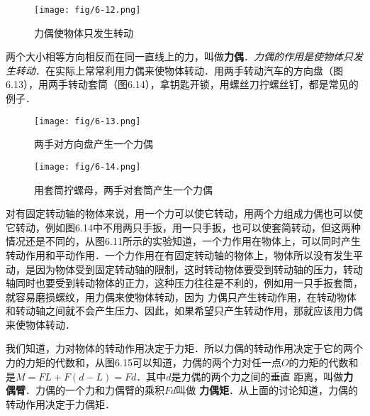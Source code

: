 \begin{figure}[htp]
\centering\texttt{[image: fig/6-12.png]}
\caption{力偶使物体只发生转动}
\end{figure}

两个大小相等方向相反而在同一直线上的力，叫做\textbf{力偶}．\textit{力偶的作用是使物体只发生转动}．在实际上常常利用力偶来使物体转动．用两手转动汽车的方向盘（图6.13），用两手转动套筒（图6.14），拿钥匙开锁，用螺丝刀拧螺丝钉，都是常见的例子．
\begin{figure}[htp]\centering
	\begin{minipage}[t]{0.48\textwidth}
		\centering
		\texttt{[image: fig/6-13.png]}
		\caption{两手对方向盘产生一个力偶}
	\end{minipage}
	\begin{minipage}[t]{0.48\textwidth}
		\centering
		\texttt{[image: fig/6-14.png]}
\caption{用套筒拧螺母，两手对套筒产生一个力偶}
	\end{minipage}
\end{figure}

对有固定转动轴的物体来说，用一个力可以使它转动，用两个力组成力偶也可以使它转动，例如图6.14中不用两只手扳，用一只手扳，也可以使套简转动，但这两种情况还是不同的，从图6.11所示的实验知道，一个力作用在物体上，可以同时产生转动作用和平动作用．一个力作用在有固定转动轴的物体上，物体所以没有发生平动，是因为物体受到固定转动轴的限制，这时转动物体要受到转动轴的压力，转动轴同时也要受到转动物体的正力，这种压力往往是不利的，例如用一只手扳套筒，就容易磨损螺纹，用力偶来使物体转动，因为
力偶只产生转动作用，在转动物体和转动轴之间就不会产生压力、因此，如果希望只产生转动作用，那就应该用力偶来使物体转动．
\begin{figure}[htp]
\centering
{}
\caption{}
\end{figure}

我们知道，力对物体的转动作用决定于力矩．所以力偶的转动作用决定于它的两个力的力矩的代数和，从图6.15可以知道，力偶的两个力对任一点$O$的力矩的代数和是$M=FL+F(d-L)=Fd$．其中$d$是力偶的两个力之间的垂直
距离，叫做\textbf{力偶臂}．力偶的一个力和力偶臂的乘积$Fd$叫做
\textbf{力偶矩}．从上面的讨论知道，力偶的转动作用决定于力偶矩．

